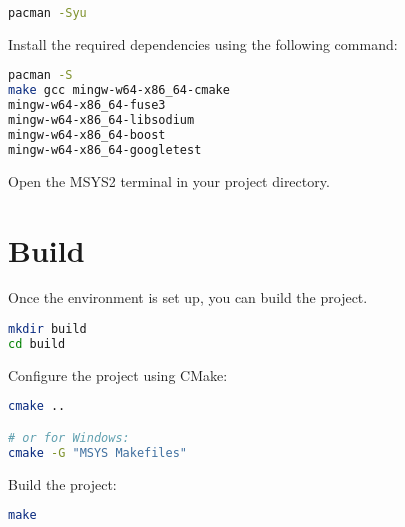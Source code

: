 \begin{lstlisting}[language=bash, basicstyle=\ttfamily\small]
pacman -Syu
\end{lstlisting}

Install the required dependencies using the following command:
\begin{lstlisting}[language=bash, basicstyle=\ttfamily\small]
pacman -S
make gcc mingw-w64-x86_64-cmake
mingw-w64-x86_64-fuse3
mingw-w64-x86_64-libsodium
mingw-w64-x86_64-boost
mingw-w64-x86_64-googletest
\end{lstlisting}

Open the MSYS2 terminal in your project directory.

\section{Build}\label{sec:build}

Once the environment is set up, you can build the project.

\begin{lstlisting}[language=bash, basicstyle=\ttfamily\small]
mkdir build
cd build
\end{lstlisting}

Configure the project using CMake:
\begin{lstlisting}[language=bash, basicstyle=\ttfamily\small]
cmake ..

# or for Windows:
cmake -G "MSYS Makefiles"
\end{lstlisting}

Build the project:
\begin{lstlisting}[language=bash, basicstyle=\ttfamily\small]
make
\end{lstlisting}

